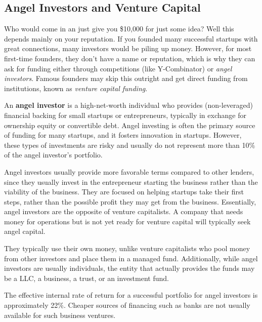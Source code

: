 \documentclass{article}
\begin{document}
  \subsection{Angel Investors and Venture Capital}

    Who would come in an just give you \$10,000 for just some idea? Well this depends mainly on your reputation. If you founded many successful startups with great connections, many investors would be piling up money. However, for most first-time founders, they don't have a name or reputation, which is why they can ask for funding either through competitions (like Y-Combinator) or \textit{angel investors}. Famous founders may skip this outright and get direct funding from institutions, known as \textit{venture capital funding}. 

    \begin{definition}
      \label{def:angel-investor}
      An \textbf{angel investor} is a high-net-worth individual who provides (non-leveraged) financial backing for small startups or entrepreneurs, typically in exchange for ownership equity or convertible debt. Angel investing is often the primary source of funding for many startups, and it fosters innovation in startups. However, these types of investments are risky and usually do not represent more than 10\% of the angel investor's portfolio. 

      Angel investors usually provide more favorable terms compared to other lenders, since they usually invest in the entrepreneur starting the business rather than the viability of the business. They are focused on helping startups take their first steps, rather than the possible profit they may get from the business. Essentially, angel investors are the opposite of venture capitalists. A company that needs money for operations but is not yet ready for venture capital will typically seek angel capital. 

      They typically use their own money, unlike venture capitalists who pool money from other investors and place them in a managed fund. Additionally, while angel investors are usually individuals, the entity that actually provides the funds may be a LLC, a business, a trust, or an investment fund. 

      The effective internal rate of return for a successful portfolio for angel investors is approximately 22\%. Cheaper sources of financing such as banks are not usually available for such business ventures. 
    \end{definition}
\end{document}
